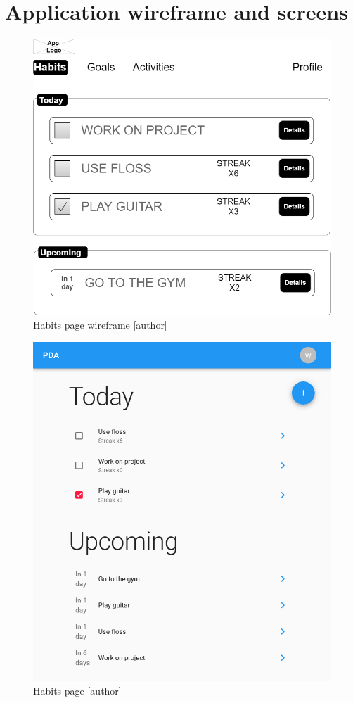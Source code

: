 
\chapter{Application wireframe and screens}\label{ch:app-wireframe-screens}

\begin{figure}[h!]
    \includegraphics[width=1\textwidth]{images/habits-wireframe}
    \caption{Habits page wireframe [author]}\label{fig:figure1}
\end{figure}


\begin{figure}[h!]
    \includegraphics[width=1\textwidth]{images/habits-page-1}
    \caption{Habits page [author]}\label{fig:figure2}
\end{figure}

